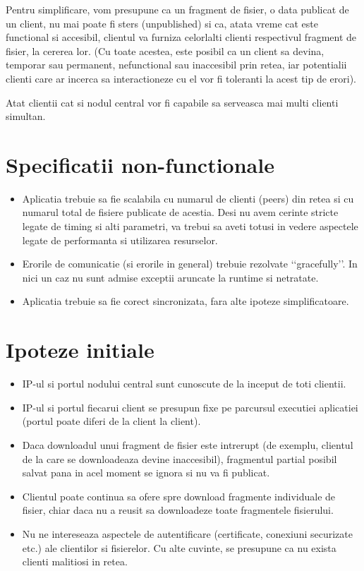 \documentclass[a4paper]{article}
\begin{document}
\par Pentru simplificare, vom presupune ca un fragment de fisier, o data publicat de un client, nu mai poate fi sters (unpublished) si ca, atata vreme cat este functional si accesibil, clientul va furniza celorlalti clienti respectivul fragment de fisier, la cererea lor. (Cu toate acestea, este posibil ca un client sa devina, temporar sau permanent, nefunctional sau inaccesibil prin retea, iar potentialii clienti care ar incerca sa interactioneze cu el vor fi toleranti la acest tip de erori).

\par Atat clientii cat si nodul central vor fi capabile sa serveasca mai multi clienti simultan.

\section{Specificatii non-functionale}
\label{sec2}
\begin{itemize}
	\item Aplicatia trebuie sa fie scalabila cu numarul de clienti (peers) din retea si cu numarul total de fisiere publicate de acestia. Desi nu avem cerinte stricte legate de timing si alti parametri, va trebui sa aveti totusi in vedere aspectele legate de performanta si utilizarea resurselor.
	\item Erorile de comunicatie (si erorile in general) trebuie rezolvate \lq\lq{}gracefully\rq\rq{}. In nici un caz nu sunt admise exceptii aruncate la runtime si netratate.
	\item Aplicatia trebuie sa fie corect sincronizata, fara alte ipoteze simplificatoare.
\end{itemize}

\section{Ipoteze initiale}
\label{sec3}

\begin{itemize}[noitemsep]
	\item IP-ul si portul nodului central sunt cunoscute de la inceput de toti clientii.
	\item IP-ul si portul fiecarui client se presupun fixe pe parcursul executiei aplicatiei (portul poate diferi de la client la client).
	\item Daca downloadul unui fragment de fisier este intrerupt (de exemplu, clientul de la care se downloadeaza devine inaccesibil), fragmentul partial posibil salvat pana in acel moment se ignora si nu va fi publicat.
	\item Clientul poate continua sa ofere spre download fragmente individuale de fisier, chiar daca nu a reusit sa downloadeze toate fragmentele fisierului.
	\item Nu ne intereseaza aspectele de autentificare (certificate, conexiuni securizate etc.) ale clientilor si fisierelor. Cu alte cuvinte, se presupune ca nu exista clienti malitiosi in retea.
\end{itemize}
\end{document}
